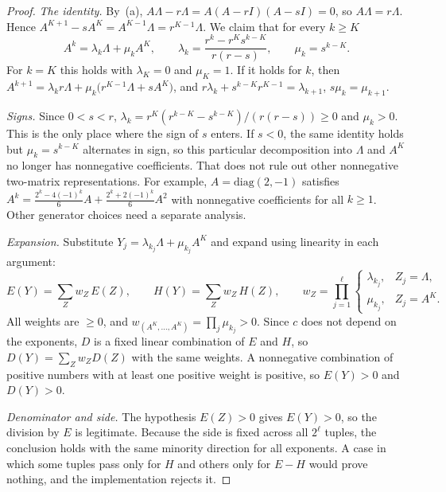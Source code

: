 \documentclass[11pt]{amsart}
\theoremstyle{definition}
\theoremstyle{remark}
\begin{document}
\begin{proof}
\emph{The identity.} By~(a), $A\Lambda-r\Lambda=A(A-rI)(A-sI)=0$, so $A\Lambda=r\Lambda$. Hence $A^{K+1}-sA^K=A^{K-1}\Lambda=r^{K-1}\Lambda$. We claim that for every $k\ge K$
\[
A^k=\lambda_k\Lambda+\mu_kA^K,\qquad \lambda_k=\frac{r^k-r^Ks^{k-K}}{r(r-s)},\qquad \mu_k=s^{k-K}.
\]
For $k=K$ this holds with $\lambda_K=0$ and $\mu_K=1$. If it holds for $k$, then
$A^{k+1}=\lambda_kr\Lambda+\mu_k\bigl(r^{K-1}\Lambda+sA^K\bigr)$, and $r\lambda_k+s^{k-K}r^{K-1}=\lambda_{k+1}$, $s\mu_k=\mu_{k+1}$.

\emph{Signs.} Since $0<s<r$, $\lambda_k=r^{K}(r^{k-K}-s^{k-K})/(r(r-s))\ge0$ and $\mu_k>0$. This is the only place where the sign of $s$ enters. If $s<0$, the same identity holds but $\mu_k=s^{k-K}$ alternates in sign, so this particular decomposition into $\Lambda$ and $A^K$ no longer has nonnegative coefficients. That does not rule out other nonnegative two-matrix representations. For example, $A=\mathrm{diag}(2,-1)$ satisfies $A^k=\tfrac{2^k-4(-1)^k}{6}A+\tfrac{2^k+2(-1)^k}{6}A^2$ with nonnegative coefficients for all $k\ge1$. Other generator choices need a separate analysis.

\emph{Expansion.} Substitute $Y_j=\lambda_{k_j}\Lambda+\mu_{k_j}A^K$ and expand using linearity in each argument:
\[
E(Y)=\sum_{Z}w_Z\,E(Z),\qquad H(Y)=\sum_Z w_Z\,H(Z),\qquad w_Z=\prod_{j=1}^{\ell}\begin{cases}\lambda_{k_j},&Z_j=\Lambda,\\ \mu_{k_j},&Z_j=A^K.\end{cases}
\]
All weights are $\ge0$, and $w_{(A^K,\dots,A^K)}=\prod_j\mu_{k_j}>0$. Since $c$ does not depend on the exponents, $D$ is a fixed linear combination of $E$ and $H$, so $D(Y)=\sum_Zw_ZD(Z)$ with the same weights. A nonnegative combination of positive numbers with at least one positive weight is positive, so $E(Y)>0$ and $D(Y)>0$.

\emph{Denominator and side.} The hypothesis $E(Z)>0$ gives $E(Y)>0$, so the division by $E$ is legitimate. Because the side is fixed across all $2^\ell$ tuples, the conclusion holds with the same minority direction for all exponents. A case in which some tuples pass only for $H$ and others only for $E-H$ would prove nothing, and the implementation rejects it.
\end{proof}
\end{document}
